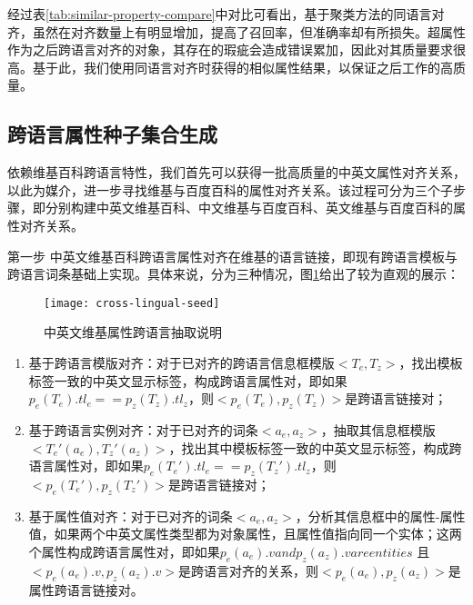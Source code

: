 经过表\ref{tab:similar-property-compare}中对比可看出，基于聚类方法的同语言对齐，虽然在对齐数量上有明显增加，提高了召回率，但准确率却有所损失。超属性作为之后跨语言对齐的对象，其存在的瑕疵会造成错误累加，因此对其质量要求很高。基于此，我们使用同语言对齐时获得的相似属性结果，以保证之后工作的高质量。

\subsection{跨语言属性种子集合生成}
\label{sec:cross-lingual-seed}
依赖维基百科跨语言特性，我们首先可以获得一批高质量的中英文属性对齐关系，以此为媒介，进一步寻找维基与百度百科的属性对齐关系。该过程可分为三个子步骤，即分别构建中英文维基百科、中文维基与百度百科、英文维基与百度百科的属性对齐关系。

{\heiti 第一步 中英文维基百科跨语言属性对齐}在维基的语言链接，即现有跨语言模板与跨语言词条基础上实现。具体来说，分为三种情况，图\ref{fig:cross-lingual-seed}给出了较为直观的展示：

\begin{figure}[h]
  \centering
    \texttt{[image: cross-lingual-seed]}
  \caption{中英文维基属性跨语言抽取说明}
  \label{fig:cross-lingual-seed}
\end{figure}

\begin{enumerate}[1)]
\item  {\heiti 基于跨语言模版对齐：}对于已对齐的跨语言信息框模版$<T_e, T_z>$，找出模板标签一致的中英文显示标签，构成跨语言属性对，即如果$p_e(T_e).tl_e == p_z(T_z).tl_z$，则$<p_e(T_e), p_z(T_z)>$是跨语言链接对；
\item  {\heiti 基于跨语言实例对齐：}对于已对齐的词条$<a_e, a_z>$，抽取其信息框模版$<T_e'(a_e), T_z'(a_z)>$，找出其中模板标签一致的中英文显示标签，构成跨语言属性对，即如果$p_e(T_e').tl_e == p_z(T_z').tl_z$，则$<p_e(T_e'), p_z(T_z')>$是跨语言链接对；
\item  {\heiti 基于属性值对齐：}对于已对齐的词条$<a_e, a_z>$，分析其信息框中的属性-属性值，如果两个中英文属性类型都为对象属性，且属性值指向同一个实体；这两个属性构成跨语言属性对，即如果$p_e(a_e).v and p_z(a_z).v are entities$ 且 $<p_e(a_e).v, p_z(a_z).v>$是跨语言对齐的关系，则$<p_e(a_e), p_z(a_z)>$是属性跨语言链接对。
\end{enumerate}

